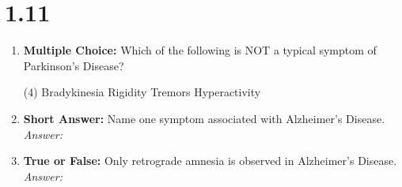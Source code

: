 \squigglyline
\section*{1.11}
\begin{enumerate}[label=\textbf{Q1.11.\arabic*}]
      \item \textbf{Multiple Choice:} Which of the following is NOT a typical symptom of Parkinson's Disease? 
      \begin{tasks}[label=\textcolor{\documentTheme}{(\Alph*)}, item-format=\color{\documentTheme}, label-width=1.5em, item-indent=1.7em](4) 
            \task Bradykinesia
            \task Rigidity
            \task Tremors
            \task Hyperactivity
      \end{tasks}

      \item \textbf{Short Answer:} Name one symptom associated with Alzheimer's Disease. \\
            \textit{Answer:} %

      \item \textbf{True or False:} Only retrograde amnesia is observed in Alzheimer's Disease. \\
            \textit{Answer:} %
\end{enumerate}
